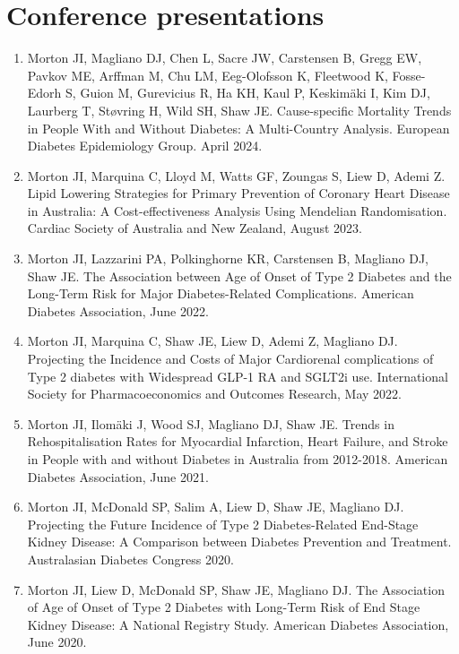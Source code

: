 \documentclass[11pt]{article}
\begin{document}
\section*{Conference presentations}
\begin{enumerate}
\item Morton JI, Magliano DJ, Chen L, Sacre JW, Carstensen B, Gregg EW, Pavkov ME, Arffman M, 
Chu LM, Eeg-Olofsson K, Fleetwood K, Fosse-Edorh S, Guion M, Gurevicius R, Ha KH, Kaul P, 
Keskim{\"a}ki I, Kim DJ, Laurberg T, St{\o}vring H, Wild SH, Shaw JE. Cause-specific
Mortality Trends in People With and Without Diabetes: A Multi-Country Analysis. 
European Diabetes Epidemiology Group. April 2024.
\item Morton JI, Marquina C, Lloyd M, Watts GF, Zoungas S, Liew D, Ademi Z. 
Lipid Lowering Strategies for Primary Prevention of Coronary Heart Disease in Australia: 
A Cost-effectiveness Analysis Using Mendelian Randomisation. 
Cardiac Society of Australia and New Zealand, August 2023.
\item Morton JI, Lazzarini PA, Polkinghorne KR, Carstensen B, Magliano DJ, Shaw JE. 
The Association between Age of Onset of Type 2 Diabetes and the Long-Term Risk for Major Diabetes-Related Complications. 
American Diabetes Association, June 2022. 
\item Morton JI, Marquina C, Shaw JE, Liew D, Ademi Z, Magliano DJ. 
Projecting the Incidence and Costs of Major Cardiorenal complications of 
Type 2 diabetes with Widespread GLP-1 RA and SGLT2i use. 
International Society for Pharmacoeconomics and Outcomes Research, May 2022.
\item Morton JI, Ilom{\"a}ki J, Wood SJ, Magliano DJ, Shaw JE. 
Trends in Rehospitalisation Rates for Myocardial Infarction, Heart Failure, and Stroke in People with
and without Diabetes in Australia from 2012-2018. American Diabetes Association, June 2021.
\item Morton JI, McDonald SP, Salim A, Liew D, Shaw JE, Magliano DJ. 
Projecting the Future Incidence of Type 2 Diabetes-Related End-Stage Kidney Disease: 
A Comparison between Diabetes Prevention and Treatment. Australasian Diabetes Congress 2020.
\item Morton JI, Liew D, McDonald SP, Shaw JE, Magliano DJ. 
The Association of Age of Onset of Type 2 Diabetes with Long-Term Risk of End Stage Kidney Disease: 
A National Registry Study. American Diabetes Association, June 2020.  
\end{enumerate}
\end{document}
